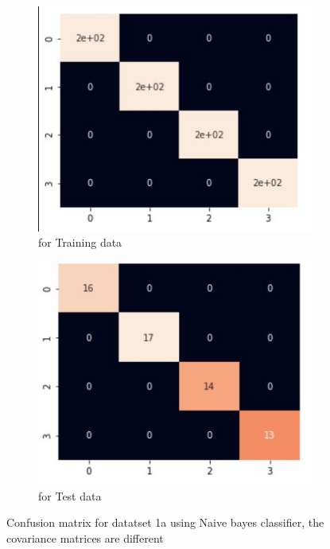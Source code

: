 \documentclass[11pt]{article}
\begin{document}
\begin{figure}[h]
\centering
	\begin{subfigure}[b]{0.45\textwidth}
	\centering
	\includegraphics[scale=0.6]{dataset1a_nb_differentC_hm_train.jpg}
	\caption{for Training data}
	\label{fig:fig2.2.3.1}
	\end{subfigure}
	\hfill
	\begin{subfigure}[b]{0.45\textwidth}
	\centering
	\includegraphics[scale=0.6]{dataset1a_nb_differentC_hm_test.jpg}
	\caption{for Test data}
	\label{fig:fig2.2.3.2}
	\end{subfigure}
\caption{Confusion matrix for datatset 1a using Naive bayes classifier,  the covariance matrices are different}
\label{fig:fig1.2.1}
\end{figure}
\end{document}
